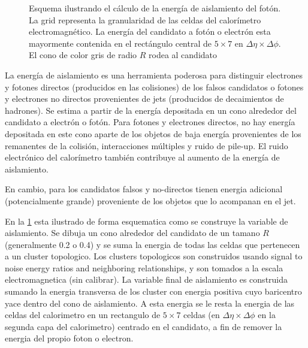 


\begin{figure}[!htbp]
  \centering

  \resizebox{0.5\textwidth}{!}{
    
  }

  \caption{Esquema ilustrando el cálculo de la energía de aislamiento del fotón. La grid representa
    la granularidad de las celdas del calorímetro electromagnético. La energía del candidato a fotón o electrón
    esta mayormente contenida en el rectángulo central de $5 \times 7$ en $\Delta\eta \times \Delta\phi$. El
    cono de color gris de radio $R$ rodea al candidato}
  \label{fig:topoetcone}

\end{figure}


La energía de aislamiento es una herramienta poderosa para distinguir electrones
y fotones directos (producidos en las colisiones) de los falsos candidatos o
fotones y electrones no directos provenientes de jets (producidos de
decaimientos de hadrones). Se estima a partir de la energía depositada en un
cono alrededor del candidato a electrón o fotón. Para fotones y electrones
directos, no hay energía depositada en este cono aparte de los objetos de baja
energía provenientes de los remanentes de la colisión, interacciones múltiples y
ruido de pile-up. El ruido electrónico del calorímetro también contribuye al
aumento de la energía de aislamiento.

En cambio, para los candidatos falsos y no-directos tienen energia adicional
(potencialmente grande) proveniente de los objetos que lo acompanan en el jet.


En la \cref{fig:topoetcone} esta ilustrado de forma esquematica como se
construye la variable de aislamiento. Se dibuja un cono alrededor del candidato
de un tamano $R$ (generalmente 0.2 o 0.4) y se suma la energia de todas las
celdas que pertenecen a un cluster topologico. Los clusters topologicos son
construidos usando signal to noise energy ratios and neighboring relationships,
y son tomados a la escala electromagnetica (sin calibrar). La variable final de
aislamiento es construida sumando la energia transversa de los cluster con
energia positiva cuyo baricentro yace dentro del cono de aislamiento. A esta
energia se le resta la energia de las celdas del calorimetro en un rectangulo de
$5\times 7$ celdas (en $\Delta\eta \times \Delta\phi$ en la segunda capa del
calorimetro) centrado en el candidato, a fin de remover la energia del propio
foton o electron.

